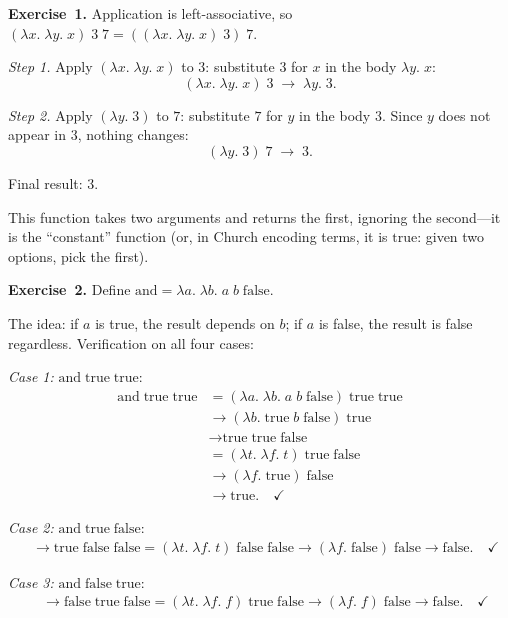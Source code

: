 \documentclass[11pt]{article}
\begin{document}
\textbf{Exercise~1.}
Application is left-associative, so
$(\lambda x.\;\lambda y.\; x)\; 3\; 7 = ((\lambda x.\;\lambda y.\; x)\; 3)\; 7$.

\emph{Step 1.}  Apply $(\lambda x.\;\lambda y.\; x)$ to $3$:
substitute $3$ for $x$ in the body $\lambda y.\; x$:
\[
  (\lambda x.\;\lambda y.\; x)\; 3 \;\longrightarrow\; \lambda y.\; 3.
\]

\emph{Step 2.}  Apply $(\lambda y.\; 3)$ to $7$:
substitute $7$ for $y$ in the body $3$.  Since $y$ does not appear in
$3$, nothing changes:
\[
  (\lambda y.\; 3)\; 7 \;\longrightarrow\; 3.
\]

Final result: $3$.

This function takes two arguments and returns the first, ignoring the
second---it is the ``constant'' function (or, in Church encoding terms,
it is $\text{true}$: given two options, pick the first).

\medskip
\textbf{Exercise~2.}
Define $\text{and} = \lambda a.\;\lambda b.\; a\; b\; \text{false}$.

The idea: if $a$ is true, the result depends on $b$; if $a$ is false,
the result is false regardless.  Verification on all four cases:

\medskip
\emph{Case 1:} $\text{and}\;\text{true}\;\text{true}$:
\begin{align*}
  \text{and}\;\text{true}\;\text{true}
    &= (\lambda a.\;\lambda b.\; a\; b\; \text{false})\;\text{true}\;\text{true} \\
    &\longrightarrow (\lambda b.\; \text{true}\; b\; \text{false})\;\text{true} \\
    &\longrightarrow \text{true}\;\text{true}\;\text{false} \\
    &= (\lambda t.\;\lambda f.\; t)\;\text{true}\;\text{false} \\
    &\longrightarrow (\lambda f.\; \text{true})\;\text{false} \\
    &\longrightarrow \text{true}. \quad\checkmark
\end{align*}

\emph{Case 2:} $\text{and}\;\text{true}\;\text{false}$:
\begin{align*}
  &\longrightarrow \text{true}\;\text{false}\;\text{false}
   = (\lambda t.\;\lambda f.\; t)\;\text{false}\;\text{false}
   \longrightarrow (\lambda f.\;\text{false})\;\text{false}
   \longrightarrow \text{false}. \quad\checkmark
\end{align*}

\emph{Case 3:} $\text{and}\;\text{false}\;\text{true}$:
\begin{align*}
  &\longrightarrow \text{false}\;\text{true}\;\text{false}
   = (\lambda t.\;\lambda f.\; f)\;\text{true}\;\text{false}
   \longrightarrow (\lambda f.\; f)\;\text{false}
   \longrightarrow \text{false}. \quad\checkmark
\end{align*}
\end{document}
